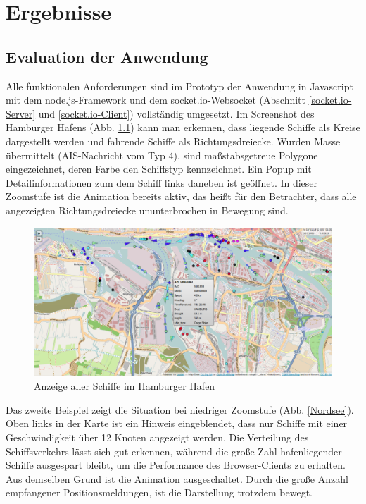 \chapter{Ergebnisse}

\section{Evaluation der Anwendung}
Alle funktionalen Anforderungen sind im Prototyp der Anwendung in Javascript mit dem node.js-Framework und dem socket.io-Websocket (Abschnitt \ref{socket.io-Server} und \ref{socket.io-Client}) vollständig umgesetzt. Im Screenshot des Hamburger Hafens (Abb. \ref{Hafen Hamburg}) kann man erkennen, dass liegende Schiffe als Kreise dargestellt werden und fahrende Schiffe als Richtungsdreiecke. Wurden Masse übermittelt (AIS-Nachricht vom Typ 4), sind maßstabsgetreue Polygone eingezeichnet, deren Farbe den Schiffstyp kennzeichnet.
Ein Popup mit Detailinformationen zum dem Schiff links daneben ist geöffnet. In dieser Zoomstufe ist die Animation bereits aktiv, das heißt für den Betrachter, dass alle angezeigten Richtungsdreiecke ununterbrochen in Bewegung sind.

\begin {figure}[H]
\begin{center}
  \includegraphics[width=6in]{images/Hamburg.png}
\end{center}
\caption{Anzeige aller Schiffe im Hamburger Hafen}
\label{Hafen Hamburg}
\end {figure}
Das zweite Beispiel zeigt die Situation bei niedriger Zoomstufe (Abb. \ref{Nordsee}). Oben links in der Karte ist ein Hinweis eingeblendet, dass nur Schiffe mit einer Geschwindigkeit über 12 Knoten angezeigt werden. Die Verteilung des Schiffsverkehrs lässt sich gut erkennen, während die große Zahl hafenliegender Schiffe ausgespart bleibt, um die Performance des Browser-Clients zu erhalten. Aus demselben Grund ist die Animation ausgeschaltet. Durch die große Anzahl empfangener Positionsmeldungen, ist die Darstellung trotzdem bewegt.

